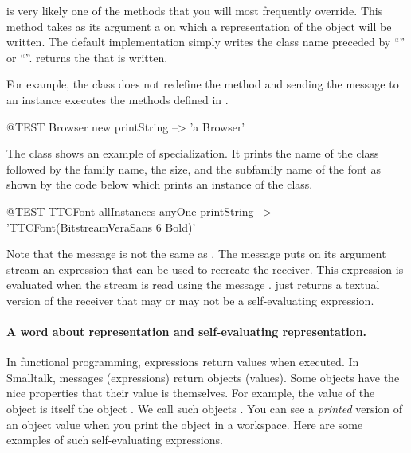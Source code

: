 \documentclass[a4paper,10pt,twoside]{book}
\begin{document}
 is very likely one of the methods that you will most frequently override.
This method takes as its argument a  on which a  representation of the object will be written.
The default implementation simply writes the class name preceded by ``'' or ``''.
 returns the  that is written.

For example, the class  does not redefine the method  and sending the message  to an instance executes the methods defined in . 
\begin{code}{@TEST}
Browser new printString --> 'a Browser'
\end{code}

The class  shows an example of  specialization.
It prints the name of the class followed by the family name, the size, and the subfamily name of the font as shown by the code below which prints an instance of the class.


\begin{code}{@TEST}
TTCFont allInstances anyOne printString --> 'TTCFont(BitstreamVeraSans 6 Bold)'
\end{code}

Note that the message  is not the same as .
The message  puts on its argument stream an expression that can be used to recreate the receiver.
This expression is evaluated when the stream is read using the message .
 just returns a textual version of the receiver that may or may not be a self-evaluating expression.

\paragraph{A word about representation and self-evaluating representation.}
In functional programming, expressions return values when executed.
In Smalltalk, messages (expressions) return objects (values).
Some objects have the nice properties that their value is themselves.
For example, the value of the object  is itself \ie the object .
We call such objects .
You can see a \emph{printed} version of an object value when you print the object in a workspace.
Here are some examples of such self-evaluating expressions. 
\end{document}
